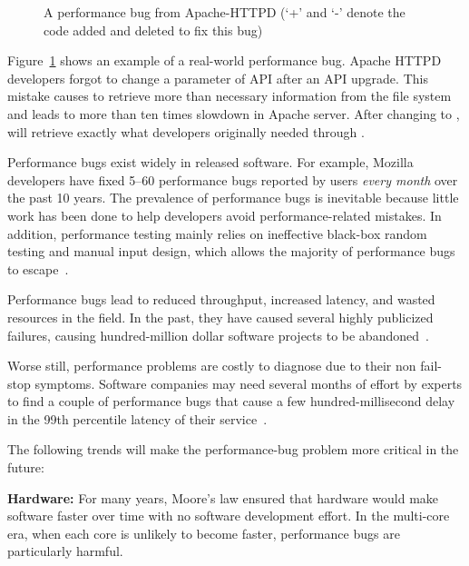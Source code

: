 \begin{figure}
\caption{A performance bug from Apache-HTTPD
  {(`+' and `-' denote the 
    code added and deleted to fix this bug)}}
\label{fig:Apache45464}
\end{figure}


Figure~\ref{fig:Apache45464} shows an example of a real-world performance bug. 
Apache HTTPD developers forgot to change a parameter of API  after an API upgrade. 
This mistake causes  to retrieve more than necessary information 
from the file system and leads to more than ten times slowdown in Apache server. 
After changing to ,  will retrieve exactly what 
developers originally needed through . 


Performance bugs exist widely in released software. 
For example, Mozilla developers have fixed 5--60 performance bugs
reported by users {\it every month} over the past 10 years.
The prevalence of performance bugs is inevitable because
little work has been done to help developers avoid
performance-related mistakes. In addition,
performance testing mainly relies on ineffective black-box random 
testing and manual input design, which allows the majority of performance bugs
to escape~\citep{rily.perftest}.

Performance bugs lead to reduced throughput, increased latency, and 
wasted resources in the field. 
In the past, they have caused several 
highly publicized failures, causing hundred-million dollar software 
projects to be abandoned~\citep{colorado,uk}.

Worse still, performance problems are costly to 
diagnose due to their non fail-stop symptoms.
Software companies may need several months of effort by experts
to find a couple of performance bugs that cause a few 
hundred-millisecond delay in
the 99th percentile latency of their service~\citep{dicksites}.

The following trends will make the performance-bug problem more critical
in the future:


{\bf Hardware:} For many years, 
  Moore's law ensured that hardware would make software faster over time 
  with no software
  development effort. In the multi-core era, when each core is unlikely to 
  become faster, performance bugs are particularly harmful.

